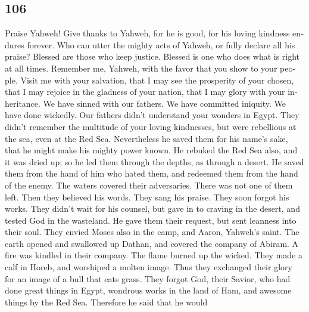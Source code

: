 \begin{paracol}{2}
\switchcolumn
\begin{otherlanguage}{english}

\hypertarget{section-211}{%
\section{106}\label{section-211}}

 Praise Yahweh! Give thanks to Yahweh, for he is good, for
his loving kindness endures forever.  Who can utter the
mighty acts of Yahweh, or fully declare all his praise? 
Blessed are those who keep justice. Blessed is one who does what is
right at all times.  Remember me, Yahweh, with the favor
that you show to your people. Visit me with your salvation,
 that I may see the prosperity of your chosen, that I may
rejoice in the gladness of your nation, that I may glory with your
inheritance.  We have sinned with our fathers. We have
committed iniquity. We have done wickedly.  Our fathers
didn't understand your wonders in Egypt. They didn't remember the
multitude of your loving kindnesses, but were rebellious at the sea,
even at the Red Sea.  Nevertheless he saved them for his
name's sake, that he might make his mighty power known. 
He rebuked the Red Sea also, and it was dried up; so he led them through
the depths, as through a desert.  He saved them from the
hand of him who hated them, and redeemed them from the hand of the
enemy.  The waters covered their adversaries. There was
not one of them left.  Then they believed his words. They
sang his praise.  They soon forgot his works. They didn't
wait for his counsel,  but gave in to craving in the
desert, and tested God in the wasteland.  He gave them
their request, but sent leanness into their soul.  They
envied Moses also in the camp, and Aaron, Yahweh's saint.
 The earth opened and swallowed up Dathan, and covered
the company of Abiram.  A fire was kindled in their
company. The flame burned up the wicked.  They made a
calf in Horeb, and worshiped a molten image.  Thus they
exchanged their glory for an image of a bull that eats grass.
 They forgot God, their Savior, who had done great things
in Egypt,  wondrous works in the land of Ham, and awesome
things by the Red Sea.  Therefore he said that he would

\end{otherlanguage}
\end{paracol}
